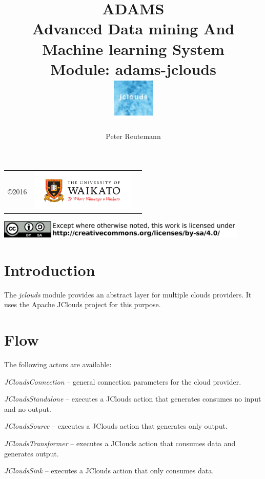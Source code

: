 \documentclass[a4paper]{book}
\title{
  \textbf{ADAMS} \\
  {\Large \textbf{A}dvanced \textbf{D}ata mining \textbf{A}nd \textbf{M}achine
  learning \textbf{S}ystem} \\
  {\Large Module: adams-jclouds} \\
  \vspace{1cm}
  \includegraphics[width=2cm]{images/jclouds-module.png} \\
}
\author{
  Peter Reutemann
}
\begin{document}
\begin{titlepage}
\maketitle

\thispagestyle{empty}
\center
\begin{table}[b]
	\begin{tabular}{c l l}
		\parbox[c][2cm]{2cm}{\copyright 2016} &
		\parbox[c][2cm]{5cm}{\includegraphics[width=5cm]{images/coat_of_arms.pdf}} \\
	\end{tabular}
	\includegraphics[width=12cm]{images/cc.png} \\
\end{table}

\end{titlepage}

\tableofcontents
\listoffigures

\chapter{Introduction}
The \textit{jclouds} module provides an abstract layer for multiple clouds
providers. It uses the Apache JClouds project \cite{jclouds} for this purpose.

\chapter{Flow}

The following actors are available:
\begin{tight_itemize}
  \item \textit{JCloudsConnection} -- general connection parameters for
  the cloud provider.
  \item \textit{JCloudsStandalone} -- executes a JClouds action that generates
  consumes no input and no output.
  \item \textit{JCloudsSource} -- executes a JClouds action that generates
  only output.
  \item \textit{JCloudsTransformer} -- executes a JClouds action that consumes
  data and generates output.
  \item \textit{JCloudsSink} -- executes a JClouds action that only consumes data.
\end{tight_itemize}
\end{document}
